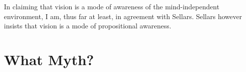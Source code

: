 \documentclass[12pt]{article}
\begin{document}
In claiming that vision is a mode of awareness of the mind-independent environment, I am, thus far at least, in agreement with Sellars. Sellars however insists that vision is a mode of propositional awareness. %




\section{What Myth?} %
\label{sec:what_myth_}


 
 
\end{document}
